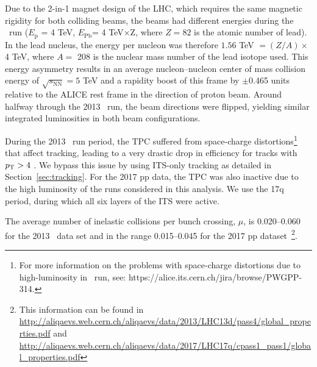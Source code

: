 Due to the 2-in-1 magnet design of the LHC, which requires the same magnetic rigidity for both colliding beams, the beams had different energies during the \pPb~run ({$E_{\mathrm{p}}$ = 4 TeV}, {$E_{\mathrm{Pb}} $= 4 TeV$\times$Z}, where $Z=82$ is the atomic number of lead). In the lead nucleus, the energy per nucleon was therefore  {$1.56$ TeV $= (Z/A) \times$ 4 TeV}, where $A =$ 208 is the nuclear
mass number of the lead isotope used. This energy asymmetry results in an average nucleon--nucleon center of mass collision energy of {$\sqrt{s_{\mathrm{NN}}}=5 $ TeV} and a rapidity boost of this frame by $\pm$0.465 units relative to the ALICE rest frame in the direction of proton beam. Around halfway through the 2013 \pPb~run, the beam directions were flipped, yielding similar integrated luminosities in both beam configurations. %

During the 2013 \pPb~run period, the TPC suffered from space-charge distortions\footnote{For more information on the problems with space-charge distortions due to high-luminosity in \pPb~run, see: https://alice.its.cern.ch/jira/browse/PWGPP-314.} that affect tracking, leading to a very drastic drop in efficiency for tracks with $p_{\mathrm{T}}> 4$ \GeVc. We bypass this issue by using ITS-only tracking as detailed in Section~\ref{sec:tracking}.
For the 2017 pp data, the TPC was also inactive due to the high luminosity of the runs considered in this analysis. We use the 17q period, during which all six layers of the ITS were active.

The average number of inelastic collisions per bunch crossing, $\mu$, is 0.020--0.060 for the 2013 \pPb~data set and in the range 0.015--0.045 for the 2017 pp dataset~\footnote{This information can be found in \url{http://aliqaevs.web.cern.ch/aliqaevs/data/2013/LHC13d/pass4/global_properties.pdf} and \url{http://aliqaevs.web.cern.ch/aliqaevs/data/2017/LHC17q/cpass1_pass1/global_properties.pdf}}.%

